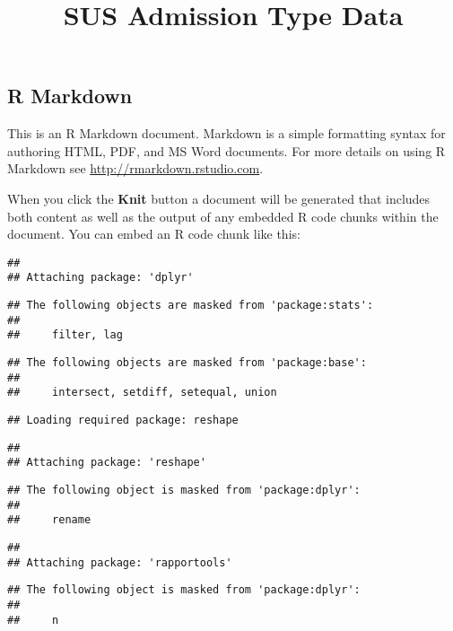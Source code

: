 \documentclass[]{article}
\title{SUS Admission Type Data}
\author{}
\date{}
\begin{document}
\maketitle

\subsection{R Markdown}\label{r-markdown}

This is an R Markdown document. Markdown is a simple formatting syntax
for authoring HTML, PDF, and MS Word documents. For more details on
using R Markdown see \url{http://rmarkdown.rstudio.com}.

When you click the \textbf{Knit} button a document will be generated
that includes both content as well as the output of any embedded R code
chunks within the document. You can embed an R code chunk like this:

\begin{verbatim}
## 
## Attaching package: 'dplyr'
\end{verbatim}

\begin{verbatim}
## The following objects are masked from 'package:stats':
## 
##     filter, lag
\end{verbatim}

\begin{verbatim}
## The following objects are masked from 'package:base':
## 
##     intersect, setdiff, setequal, union
\end{verbatim}

\begin{verbatim}
## Loading required package: reshape
\end{verbatim}

\begin{verbatim}
## 
## Attaching package: 'reshape'
\end{verbatim}

\begin{verbatim}
## The following object is masked from 'package:dplyr':
## 
##     rename
\end{verbatim}

\begin{verbatim}
## 
## Attaching package: 'rapportools'
\end{verbatim}

\begin{verbatim}
## The following object is masked from 'package:dplyr':
## 
##     n
\end{verbatim}
\end{document}
